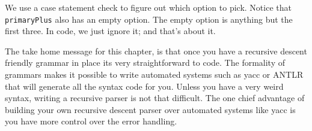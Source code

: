 We use a case statement check to figure out which option to pick. Notice that {\tt primaryPlus} also has an empty option. The empty option is anything but the first three. In code, we just ignore it; and that's about it.

The take home message for this chapter, is that once you have a recursive descent friendly grammar in place its very straightforward to code. The formality of grammars makes it possible to write automated systems such as yacc or ANTLR that will generate all the syntax code for you. Unless you have a very weird syntax, writing a recursive parser is not that difficult.  The one chief advantage of building your own recursive descent parser over automated systems like yacc is you have more control over the error handling.

\begin{center}
\end{center} 